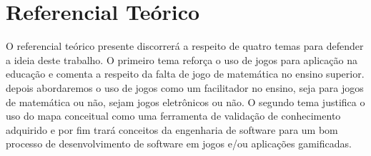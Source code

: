 \chapter[Referencial Teórico]{Referencial Teórico}
O referencial teórico presente discorrerá a respeito de quatro temas para defender a ideia deste trabalho. O primeiro tema  reforça o uso de jogos para aplicação na educação e comenta a respeito da falta de jogo de matemática no ensino superior.  depois abordaremos o uso de jogos como um facilitador no ensino, seja para jogos de matemática ou não, sejam jogos eletrônicos ou não. O segundo tema justifica o uso do mapa conceitual como uma ferramenta de validação de conhecimento adquirido e por fim trará conceitos da engenharia de software para um bom processo de desenvolvimento de software em jogos e/ou aplicações gamificadas. 





\begin{comment}
Existem estudos com referencial teórico apoiando o uso de gamificação em vários contextos e utilizando dos benefícios oferecidos por ela. Exemplo de contextos como marketing, saúde, educação e etc. A gamificação é também utilizada em contextos de ensino de matemática (embora não sejam muitos os resultados encontrados para universidades). Em alguns casos são utilizados a tecnologia junto da gamificação nos contextos acima citado. É dito que a tecnologia e jogos contribuem para ajudar no engajamento e chamar atenção das pessoas e dos estudantes.
Tem um estudo dizendo que não há limites para a idade de jogar, brincar e se divertir. Por isso jogo e gamificação podem ser possíveis estratégias para utilizar em comunhão de tecnologias visando o ensino de EDO 1ª ordem para estudantes do ensino superior.
 
 \end{comment}
